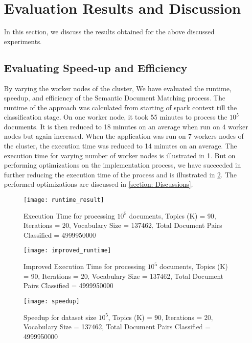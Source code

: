 \section{Evaluation Results and Discussion}

In this section, we discuss the results obtained for the above discussed experiments.

\subsection{Evaluating Speed-up and Efficiency}
\label{subsection: evaluating speed-up and efficiency}

By varying the worker nodes of the cluster, We have evaluated the runtime, speedup, and efficiency of the Semantic Document Matching process. The runtime of the approach was calculated from starting of spark context till the classification stage. On one worker node, it took 55 minutes to process the \(10^5\) documents. It is then reduced to 18 minutes on an average when run on 4 worker nodes but again increased. When the application was run on 7 workers nodes of the cluster, the execution time was reduced to 14 minutes on an average. The execution time for varying number of worker nodes is illustrated in \ref{fig: result_runtime}. But on performing optimizations on the implementation process, we have succeeded in further reducing the execution time of the process and is illustrated in \ref{fig: result_improved_runtime}. The performed optimizations are discussed in \ref{section: Discussions}.

\begin{figure}[htbp]
	\centering
		\texttt{[image: runtime\_result]}
	\caption{Execution Time for processing \(10^5\) documents, Topics (K) = 90, Iterations = 20, Vocabulary Size = 137462, Total Document Pairs Classified =  4999950000}
	\label{fig: result_runtime}
\end{figure}

\begin{figure}[htbp]
	\centering
		\texttt{[image: improved\_runtime]}
	\caption{Improved Execution Time for processing \(10^5\) documents, Topics (K) = 90, Iterations = 20, Vocabulary Size = 137462, Total Document Pairs Classified =  4999950000}
	\label{fig: result_improved_runtime}
\end{figure}


\begin{figure}[htbp]
	\centering
		\texttt{[image: speedup]}
	\caption{Speedup for dataset size \(10^5\), Topics (K) = 90, Iterations = 20, Vocabulary Size = 137462, Total Document Pairs Classified =  4999950000}
	\label{fig: result_speedup}
\end{figure}

